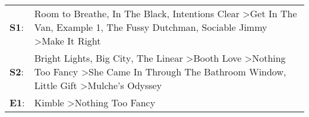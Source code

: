 \begin{supertabular}{p{0.03\textwidth}p{0.92\textwidth}}
 \textbf{S1}:  &            Room to Breathe\textsuperscript{}, \enspace In The Black\textsuperscript{}, \enspace Intentions Clear\textsuperscript{} \textgreater \enspace Get In The Van\textsuperscript{}, \enspace Example 1\textsuperscript{}, \enspace The Fussy Dutchman\textsuperscript{}, \enspace Sociable Jimmy\textsuperscript{} \textgreater \enspace Make It Right\textsuperscript{}  \enspace  \\
 \textbf{S2}:  &  Bright Lights, Big City\textsuperscript{}, \enspace The Linear\textsuperscript{} \textgreater \enspace Booth Love\textsuperscript{} \textgreater \enspace Nothing Too Fancy\textsuperscript{} \textgreater \enspace She Came In Through The Bathroom Window\textsuperscript{}, \enspace Little Gift\textsuperscript{} \textgreater \enspace Mulche's Odyssey\textsuperscript{}  \enspace  \\
 \textbf{E1}:  &                                                                                                                                                                                                                                                                                              Kimble\textsuperscript{} \textgreater \enspace Nothing Too Fancy\textsuperscript{}  \enspace  \\
\end{supertabular}

